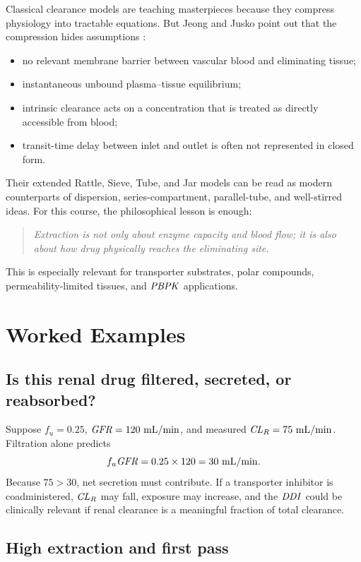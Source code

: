 \documentclass[a4paper]{article}
\newcommand{\CLR}{\ensuremath{\pksym{CL}_{R}}}
\newcommand{\fu}{\ensuremath{f_u}}
\newcommand{\GFR}{\ensuremath{\pksym{GFR}}}
\newcommand{\PBPK}{\ensuremath{\pksym{PBPK}}}
\newcommand{\DDI}{\ensuremath{\pksym{DDI}}}
\begin{document}
Classical clearance models are teaching masterpieces because they compress physiology into tractable equations. But Jeong and Jusko point out that the compression hides assumptions \cite{jeongJusko2024Clearance}:
\begin{itemize}[leftmargin=2em]
  \item no relevant membrane barrier between vascular blood and eliminating tissue;
  \item instantaneous unbound plasma--tissue equilibrium;
  \item intrinsic clearance acts on a concentration that is treated as directly accessible from blood;
  \item transit-time delay between inlet and outlet is often not represented in closed form.
\end{itemize}
Their extended Rattle, Sieve, Tube, and Jar models can be read as modern counterparts of dispersion, series-compartment, parallel-tube, and well-stirred ideas. For this course, the philosophical lesson is enough:
\begin{quote}
\itshape
Extraction is not only about enzyme capacity and blood flow; it is also about how drug physically reaches the eliminating site.
\end{quote}
This is especially relevant for transporter substrates, polar compounds, permeability-limited tissues, and \PBPK{} applications.

\section{Worked Examples}

\subsection{Is this renal drug filtered, secreted, or reabsorbed?}

Suppose \(\fu=0.25\), \(\GFR=120\ \pklab{mL/min}\), and measured \(\CLR=75\ \pklab{mL/min}\). Filtration alone predicts
\[
  \fu\GFR
  =
  0.25\times120
  =
  30\ \pklab{mL/min}.
\]
Because \(75>30\), net secretion must contribute. If a transporter inhibitor is coadministered, \(\CLR\) may fall, exposure may increase, and the \DDI{} could be clinically relevant if renal clearance is a meaningful fraction of total clearance.

\subsection{High extraction and first pass}
\end{document}

